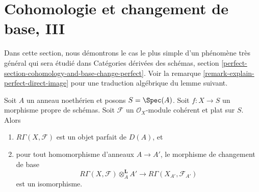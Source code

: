 \section{Cohomologie et changement de base, III}
\label{section-cohomology-and-base-change-perfect}

\noindent
Dans cette section, nous démontrons le cas le plus simple d'un phénomène très
général qui sera étudié dans
Catégories dérivées des schémas, section
\ref{perfect-section-cohomology-and-base-change-perfect}.
Voir la remarque \ref{remark-explain-perfect-direct-image} pour une
traduction algébrique du lemme suivant.

\begin{lemma}
\label{lemma-perfect-direct-image}
Soit $A$ un anneau noethérien et posons $S = \Spec(A)$. Soit $f : X \to S$ un morphisme
propre de schémas. Soit $\mathcal{F}$ un
$\mathcal{O}_X$-module cohérent et plat sur $S$. Alors
\begin{enumerate}
\item $R\Gamma(X, \mathcal{F})$ est un objet parfait de $D(A)$, et
\item pour tout homomorphisme d'anneaux $A \to A'$, le morphisme de changement de base
$$
R\Gamma(X, \mathcal{F}) \otimes_A^{\mathbf{L}} A'
\longrightarrow
R\Gamma(X_{A'}, \mathcal{F}_{A'})
$$
est un isomorphisme.
\end{enumerate}
\end{lemma}

